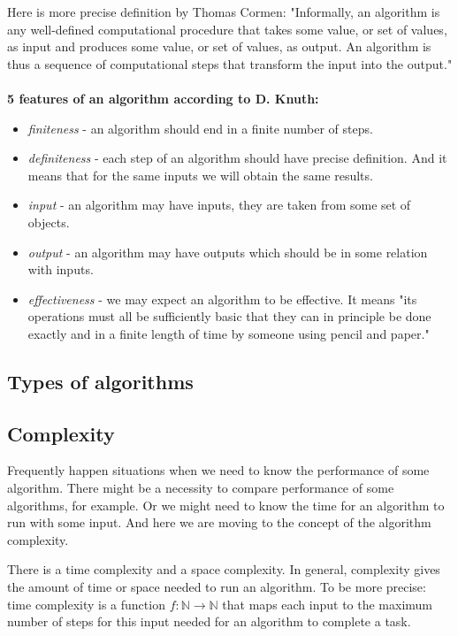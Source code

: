 \documentclass[
  field=inf,
  biblatex,
  language=english,
  glossaries,
  index
]{kidiplom}
\begin{document}
Here is more precise definition by Thomas Cormen: "Informally, an algorithm is any well-defined computational procedure that takes some value, or set of values, as input and produces some value, or set of values, as output. An algorithm is thus a sequence of computational steps that transform the input into the output." \cite{cormen}
\\\\
\textbf{5 features of an algorithm according to D. Knuth\cite{knuth1}:}
\begin{itemize}
	\item \textit{finiteness} - an algorithm should end in a finite number of steps.
	\item \textit{definiteness} - each step of an algorithm should have precise definition. And it means that for the same inputs we will obtain the same results.
	\item \textit{input} - an algorithm may have inputs, they are taken from some set of objects.
	\item \textit{output} - an algorithm may have outputs which should be in some relation with inputs.
	\item \textit{effectiveness} - we may expect an algorithm to be effective. It means "its operations must all be sufficiently basic that they can in principle be done exactly and in a finite length of time by someone using pencil and paper."\cite{knuth1}
\end{itemize}

\subsection{Types of algorithms}

\subsection{Complexity}

Frequently happen situations when we need to know the performance of some algorithm. There might be a necessity to compare performance of some algorithms, for example. Or we might need to know the time for an algorithm to run with some input. And here we are moving to the concept of the algorithm complexity.

There is a time complexity and a space complexity. In general, complexity gives the amount of time or space needed to run an algorithm. To be more precise: time complexity is a function $f:\mathbb{N}\to\mathbb{N}$ that maps each input to the maximum number of steps for this input needed for an algorithm to complete a task.
\end{document}
